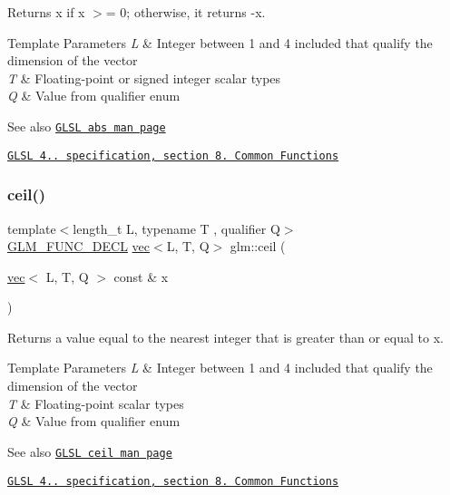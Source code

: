 Returns x if x $>$= 0; otherwise, it returns -\/x.


\begin{DoxyTemplParams}{Template Parameters}
{\em L} & Integer between 1 and 4 included that qualify the dimension of the vector \\
\hline
{\em T} & Floating-\/point or signed integer scalar types \\
\hline
{\em Q} & Value from qualifier enum\\
\hline
\end{DoxyTemplParams}
\begin{DoxySeeAlso}{See also}
\href{http://www.opengl.org/sdk/docs/manglsl/xhtml/abs.xml}{\tt G\+L\+SL abs man page} 

\href{http://www.opengl.org/registry/doc/GLSLangSpec.4.20.8.pdf}{\tt G\+L\+SL 4.. specification, section 8. Common Functions} 
\end{DoxySeeAlso}
\mbox{\label{group__core__func__common_gafb9d2a645a23aca12d4d6de0104b7657}} 
\subsubsection{\texorpdfstring{ceil()}{ceil()}}
{\footnotesize\ttfamily template$<$length\+\_\+t L, typename T , qualifier Q$>$ \\
\hyperlink{setup_8hpp_ab2d052de21a70539923e9bcbf6e83a51}{G\+L\+M\+\_\+\+F\+U\+N\+C\+\_\+\+D\+E\+CL} \hyperlink{structglm_1_1vec}{vec}$<$L, T, Q$>$ glm\+::ceil (\begin{DoxyParamCaption}\item[{\hyperlink{structglm_1_1vec}{vec}$<$ L, T, Q $>$ const \&}]{x }\end{DoxyParamCaption})}

Returns a value equal to the nearest integer that is greater than or equal to x.


\begin{DoxyTemplParams}{Template Parameters}
{\em L} & Integer between 1 and 4 included that qualify the dimension of the vector \\
\hline
{\em T} & Floating-\/point scalar types \\
\hline
{\em Q} & Value from qualifier enum\\
\hline
\end{DoxyTemplParams}
\begin{DoxySeeAlso}{See also}
\href{http://www.opengl.org/sdk/docs/manglsl/xhtml/ceil.xml}{\tt G\+L\+SL ceil man page} 

\href{http://www.opengl.org/registry/doc/GLSLangSpec.4.20.8.pdf}{\tt G\+L\+SL 4.. specification, section 8. Common Functions} 
\end{DoxySeeAlso}
\mbox{\label{group__core__func__common_ga93bce26c7d80d30a62f5c508f8498a6c}} 
